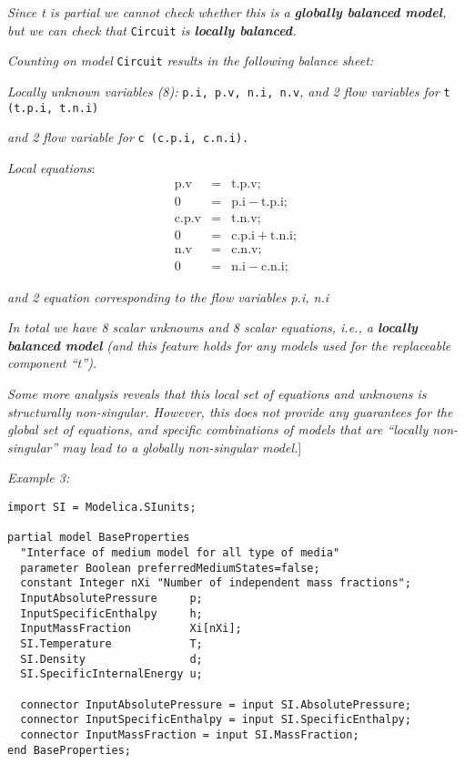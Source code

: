 \emph{Since t is partial we cannot check whether this is a
\textbf{globally balanced model}, but we can check that} \lstinline!Circuit!
\emph{is \textbf{locally balanced}.}

\emph{Counting on model} \lstinline!Circuit! \emph{results in the following balance
sheet:}

\emph{Locally unknown variables (8):} \lstinline!p.i, p.v, n.i, n.v!\emph{, and 2
flow variables for} \lstinline!t (t.p.i, t.n.i)!

\emph{and 2 flow variable for} \lstinline!c (c.p.i, c.n.i).!

\emph{Local equations}:
\begin{eqnarray*} \text{p.v} &=& \text{t.p.v};\\
0 &=& \text{p.i}-\text{t.p.i};\\
\text{c.p.v} &=& \text{t.n.v};\\
0 &=& \text{c.p.i}+\text{t.n.i};\\
\text{n.v} &=& \text{c.n.v};\\
0 &=& \text{n.i}-\text{c.n.i};
\end{eqnarray*}

\emph{and 2 equation corresponding to the flow variables p.i, n.i}

\emph{In total we have 8 scalar unknowns and 8 scalar equations, i.e., a
\textbf{locally} \textbf{balanced model} (and this feature holds for any
models used for the replaceable component ``t''). }

\emph{Some more analysis reveals that this local set of equations and
unknowns is structurally non-singular. However, this does not provide
any guarantees for the global set of equations, and specific
combinations of models that are ``locally non-singular'' may lead to a
globally non-singular model.}{]}

\emph{Example 3:}
\begin{lstlisting}[language=modelica]
import SI = Modelica.SIunits;

partial model BaseProperties
  "Interface of medium model for all type of media"
  parameter Boolean preferredMediumStates=false;
  constant Integer nXi "Number of independent mass fractions";
  InputAbsolutePressure     p;
  InputSpecificEnthalpy     h;
  InputMassFraction         Xi[nXi];
  SI.Temperature            T;
  SI.Density                d;
  SI.SpecificInternalEnergy u;

  connector InputAbsolutePressure = input SI.AbsolutePressure;
  connector InputSpecificEnthalpy = input SI.SpecificEnthalpy;
  connector InputMassFraction = input SI.MassFraction;
end BaseProperties;
\end{lstlisting}

